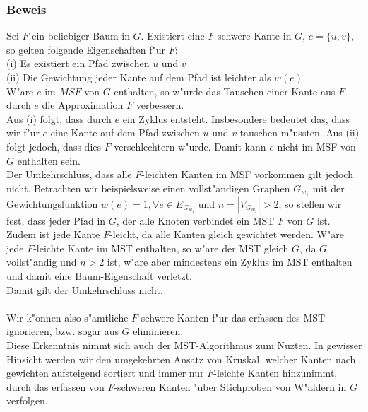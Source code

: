 \subsubsection{Beweis}
\label{sec:fProof}

Sei $F$ ein beliebiger Baum in $G$.
    Existiert eine $F$ schwere Kante in $G$, $e=\{u, v\}$, so gelten folgende 
    Eigenschaften f"ur $F$:\\
(i) Es existiert ein Pfad zwischen $u$ und $v$\\
(ii) Die Gewichtung jeder Kante auf dem Pfad ist leichter als $w(e)$\\
W"are $e$ im $MSF$ von $G$ enthalten, so w"urde das Tauschen einer Kante aus
    $F$ durch $e$ die Approximation $F$ verbessern.\\
Aus (i) folgt, dass durch $e$ ein Zyklus entsteht. Insbesondere bedeutet das, 
    dass wir f"ur $e$ eine Kante auf dem Pfad zwischen $u$ und $v$ tauschen
    m"ussten.
    Aus (ii) folgt jedoch, dass dies $F$ verschlechtern w"urde.
    Damit kann $e$ nicht im MSF von $G$ enthalten sein.\\
Der Umkehrschluss, dass alle $F$-leichten Kanten im MSF vorkommen gilt jedoch
    nicht.
    Betrachten wir beispielsweise einen vollst"andigen Graphen $G_{w_1}$ mit der 
    Gewichtungsfunktion $w(e) = 1, \forall e \in E_{G_{w_1}}$ und 
    $n = |V_{G_{w_1}}| > 2$, so stellen wir fest, dass jeder Pfad in $G$, der alle
    Knoten verbindet ein MST $F$ von $G$ ist.
    Zudem ist jede Kante $F$-leicht, da alle Kanten gleich gewichtet werden.
    W"are jede $F$-leichte Kante im MST enthalten, so w"are der MST gleich $G$,
    da $G$ vollst"andig und $n > 2$ ist, w"are aber mindestens ein Zyklus im 
    MST enthalten und damit eine Baum-Eigenschaft verletzt.\\
    Damit gilt der Umkehrschluss nicht.\\
\\
Wir k"onnen also s"amtliche $F$-schwere Kanten f"ur das erfassen des MST 
    ignorieren, bzw. sogar aus $G$ eliminieren.\\
Diese Erkenntnis nimmt sich auch der MST-Algorithmus zum Nuzten. In gewisser
    Hinsicht werden wir den umgekehrten Ansatz von Kruskal, welcher Kanten nach
    gewichten aufsteigend sortiert und immer nur $F$-leichte Kanten hinzunimmt,
    durch das erfassen von $F$-schweren Kanten "uber Stichproben von W"aldern
    in $G$ verfolgen.\\

